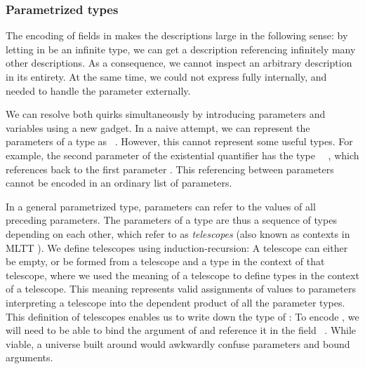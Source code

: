\subsubsection{Parametrized types}\label{ssec:background-par}
The encoding of fields in  makes the descriptions large in the following sense: by letting  in  be an infinite type, we can get a description referencing infinitely many other descriptions. As a consequence, we cannot inspect an arbitrary description in its entirety. At the same time, we could not express  fully internally, and needed to handle the parameter externally. 

We can resolve both quirks simultaneously by introducing parameters and variables using a new gadget. In a naive attempt, we can represent the parameters of a type as \ . However, this cannot represent some useful types. For example, the second parameter  of the existential quantifier  has the type \ \ , which references back to the first parameter . This referencing between parameters cannot be encoded in an ordinary list of parameters.

In a general parametrized type, parameters can refer to the values of all preceding parameters. The parameters of a type are thus a sequence of types depending on each other, which refer to as \emph{telescopes} \cite{telescopes} (also known as contexts in MLTT \cite{mltt}). We define telescopes using induction-recursion:
A telescope can either be empty, or be formed from a telescope and a type in the context of that telescope, where we used the meaning of a telescope  to define types in the context of a telescope. This meaning represents valid assignments of values to parameters
interpreting a telescope into the dependent product of all the parameter types. This definition of telescopes enables us to write down the type of :
To encode , we will need to be able to bind the argument  of  and reference it in the field \ . While viable, a universe built around  would awkwardly confuse parameters and bound arguments.

